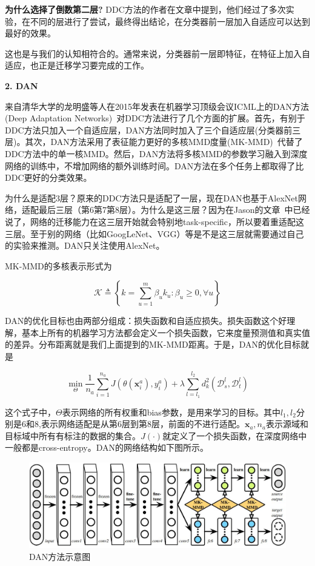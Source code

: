 \textbf{为什么选择了倒数第二层?} DDC方法的作者在文章中提到，他们经过了多次实验，在不同的层进行了尝试，最终得出结论，在分类器前一层加入自适应可以达到最好的效果。

这也是与我们的认知相符合的。通常来说，分类器前一层即特征，在特征上加入自适应，也正是迁移学习要完成的工作。

\textbf{2. DAN}

来自清华大学的龙明盛等人在2015年发表在机器学习顶级会议ICML上的DAN方法(Deep Adaptation Networks)~\cite{long2015learning}对DDC方法进行了几个方面的扩展。首先，有别于DDC方法只加入一个自适应层，DAN方法同时加入了三个自适应层(分类器前三层)。其次，DAN方法采用了表征能力更好的多核MMD度量(MK-MMD)~\cite{gretton2012optimal}代替了DDC方法中的单一核MMD。然后，DAN方法将多核MMD的参数学习融入到深度网络的训练中，不增加网络的额外训练时间。DAN方法在多个任务上都取得了比DDC更好的分类效果。

为什么是适配3层？原来的DDC方法只是适配了一层，现在DAN也基于AlexNet网络，适配最后三层（第6第7第8层）。为什么是这三层？因为在Jason的文章~\cite{yosinski2014transferable}中已经说了，网络的迁移能力在这三层开始就会特别地task-specific，所以要着重适配这三层。至于别的网络（比如GoogLeNet、VGG）等是不是这三层就需要通过自己的实验来推测。DAN只关注使用AlexNet。

MK-MMD的多核表示形式为

\begin{equation}
	\mathcal{K} \triangleq \left\{k= \sum_{u=1}^{m}\beta_u k_u : \beta_u \ge 0, \forall u \right\}
\end{equation}

DAN的优化目标也由两部分组成：损失函数和自适应损失。损失函数这个好理解，基本上所有的机器学习方法都会定义一个损失函数，它来度量预测值和真实值的差异。分布距离就是我们上面提到的MK-MMD距离。于是，DAN的优化目标就是

\begin{equation}
	\label{eq-deep-dan}
	\min_\Theta \frac{1}{n_a} \sum_{i=1}^{n_a} J(\theta(\mathbf{x}^a_i),y^a_i) + \lambda \sum_{l=l_1}^{l_2}d^2_k(\mathcal{D}^l_s,\mathcal{D}^l_t)
\end{equation}

这个式子中，$\Theta$表示网络的所有权重和bias参数，是用来学习的目标。其中$l_1,l_2$分别是6和8,表示网络适配是从第6层到第8层，前面的不进行适配。$\mathbf{x}_a,n_a$表示源域和目标域中所有有标注的数据的集合。$J(\cdot)$就定义了一个损失函数，在深度网络中一般都是cross-entropy。DAN的网络结构如下图所示。

\begin{figure}[htbp]
	\centering
	\includegraphics[scale=0.45]{./figures/fig-deep-dan.pdf}
	\caption{DAN方法示意图}
	\label{fig-deep-dan}
\end{figure}

